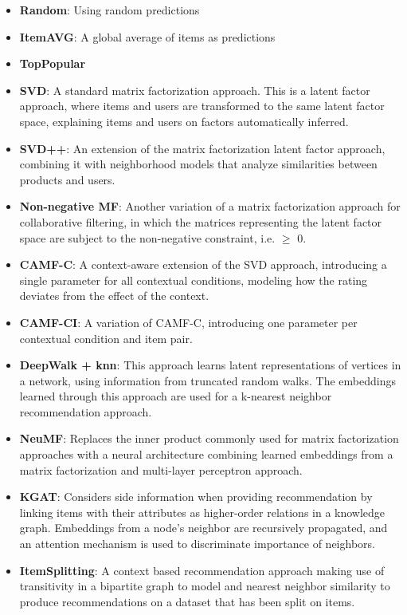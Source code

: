 \begin{itemize}
    \item \textbf{Random}: Using random predictions
    \item \textbf{ItemAVG}: A global average of items as predictions
    \item \textbf{TopPopular}
    \item \textbf{SVD\cite{standardMF}}: A standard matrix factorization approach. This is a latent factor approach, where items and users are transformed to the same latent factor space, explaining items and users on factors automatically inferred.
    \item \textbf{SVD++\cite{svd++}}: An extension of the matrix factorization latent factor approach, combining it with neighborhood models that analyze similarities between products and users.
    \item \textbf{Non-negative MF\cite{NMF}}: Another variation of a matrix factorization approach for collaborative filtering, in which the matrices representing the latent factor space are subject to the non-negative constraint, i.e. $\geq$ 0.
    \item \textbf{CAMF-C\cite{baltrunasCAMF}}: A context-aware extension of the SVD approach, introducing a single parameter for all contextual conditions, modeling how the rating deviates from the effect of the context.
    \item \textbf{CAMF-CI\cite{baltrunasCAMF}}: A variation of CAMF-C, introducing one parameter per contextual condition and item pair.
    \item \textbf{DeepWalk + knn\cite{DeepWalk}}: This approach learns latent representations of vertices in a network, using information from truncated random walks. The embeddings learned through this approach are used for a k-nearest neighbor recommendation approach.
    \item \textbf{NeuMF\cite{neuMF}}: Replaces the inner product commonly used for matrix factorization approaches with a neural architecture combining learned embeddings from a matrix factorization and multi-layer perceptron approach.
    \item \textbf{KGAT\cite{KGAT}}: Considers side information when providing recommendation by linking items with their attributes as higher-order relations in a knowledge graph. Embeddings from a node's neighbor are recursively propagated, and an attention mechanism is used to discriminate importance of neighbors.
    \item \textbf{ItemSplitting\cite{GraphBasedCollaborativePaper}}: A context based recommendation approach making use of transitivity in a bipartite graph to model and nearest neighbor similarity to produce recommendations on a dataset that has been split on items.

\end{itemize}
